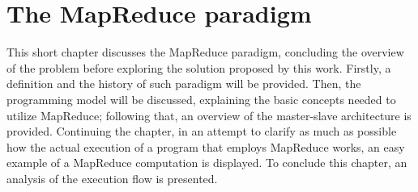 \chapter{The MapReduce paradigm}
This short chapter discusses the MapReduce paradigm, concluding the overview of the problem before exploring the solution proposed by this work. Firstly, a definition and the history of such paradigm will be provided. Then, the programming model will be discussed, explaining the basic concepts needed to utilize MapReduce; following that, an overview of the master-slave architecture is provided. Continuing the chapter, in an attempt to clarify as much as possible how the actual execution of a program that employs MapReduce works, an easy example of a MapReduce computation is displayed. To conclude this chapter, an analysis of the execution flow is presented.





